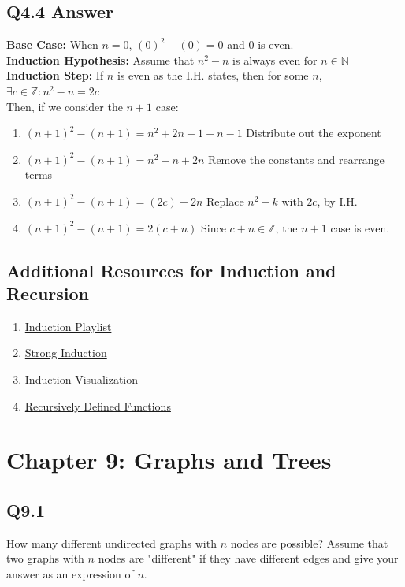 \documentclass{article}
\begin{document}
\subsection*{Q4.4 Answer}
\textbf{Base Case:} When $n=0$, $(0)^2-(0)=0$ and 0 is even.
\\ \textbf{Induction Hypothesis:} Assume that $n^2-n$ is always even for $n\in\mathbb{N}$
\\ \textbf{Induction Step:} If $n$ is even as the I.H. states, then for some $n$, $\exists c\in\mathbb{Z}:n^2-n=2c$
\\ Then, if we consider the $n+1$ case:
\begin{enumerate}[label=]
\item $(n+1)^2-(n+1) = n^2+2n+1-n-1$ Distribute out the exponent
\item $(n+1)^2-(n+1) = n^2-n+2n$ Remove the constants and rearrange terms
 \item $(n+1)^2-(n+1) = (2c)+2n$ Replace $n^2-k$ with $2c$, by I.H.
  \item $(n+1)^2-(n+1) = 2(c+n)$ Since $c+n\in\mathbb{Z}$, the $n+1$ case is even.
\end{enumerate}
\newpage

\subsection*{Additional Resources for Induction and Recursion}
\begin{enumerate}
    \item \href{https://www.youtube.com/watch?v=IdTaA6iz3Mo&list=PL5KkMZvBpo5CnkA4bi7l6W62VPoYRbOEk&index=1}{Induction Playlist}
    \item \href{https://www.youtube.com/watch?v=-vJhahLdmLI}{Strong Induction}
    \item \href{https://www.youtube.com/watch?v=5Hn8vUE3cBQ}{Induction Visualization}
    \item \href{https://www.youtube.com/watch?v=5RB4H_12wOs}{Recursively Defined Functions}
\end{enumerate}
\newpage
\section*{Chapter 9: Graphs and Trees}

\subsection*{Q9.1}
How many different undirected graphs with $n$ nodes are possible? Assume that two graphs with $n$ nodes are "different" if they have different edges and give your answer as an expression of $n$.
\newpage
\end{document}
